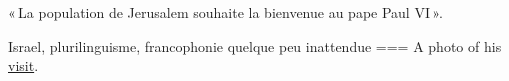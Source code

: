« La population de Jerusalem souhaite la bienvenue au pape Paul VI ».

Israel, plurilinguisme, francophonie quelque peu inattendue
===
A photo of his \href{https://imsvintagephotos.com/products/pope-paul-vl-vintage-photograph-30732}{visit}.